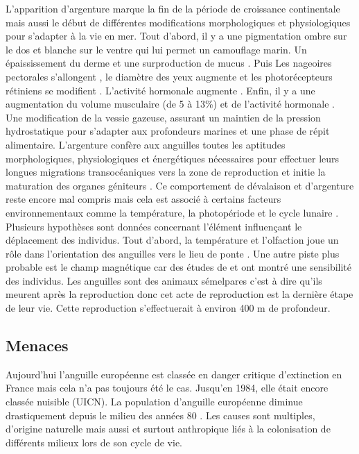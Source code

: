 \documentclass[11pt,titlepage,twoside]{article}\usepackage[]{graphicx}\usepackage[table]{xcolor}
\begin{document}
L’apparition d’argenture marque la fin de la période de croissance continentale mais aussi le début de différentes modifications morphologiques et physiologiques pour s’adapter à la vie en mer. Tout d’abord, il y a une pigmentation ombre sur le dos et blanche sur le ventre qui lui permet un camouflage marin. Un épaississement du derme et une surproduction de mucus \citep{saglio_structural_1988}.  Puis Les nageoires pectorales s’allongent \citep{durif_migration_2003}, le diamètre des yeux augmente et les photorécepteurs rétiniens se modifient \citep{adam_anguille_1997}. L’activité hormonale augmente \citep{lecomte-finiger_metamorphose_1990, pankhurst_structure_2006}. Enfin, il y a une augmentation du volume musculaire (de 5 à 13\%) et de l’activité hormonale \citep{lecomte-finiger_metamorphose_1990, pankhurst_structure_2006}. Une modification de la vessie gazeuse, assurant un maintien de la pression hydrostatique pour s’adapter aux profondeurs marines \citep{lecomte-finiger_metamorphose_1990} et une phase de répit alimentaire. L’argenture confère aux anguilles toutes les aptitudes morphologiques, physiologiques et énergétiques nécessaires pour effectuer leurs longues migrations transocéaniques vers la zone de reproduction et initie la maturation des organes géniteurs \citep{durif_durif_2009}. Ce comportement de dévalaison et d’argenture reste encore mal compris mais cela est associé à certains facteurs environnementaux comme la température, la photopériode et le cycle lunaire \citep{bruijs_silver_2009}. Plusieurs hypothèses sont données concernant l’élément influençant le déplacement des individus. Tout d’abord, la température et l’olfaction joue un rôle dans l’orientation des anguilles vers le lieu de ponte \citep{westin_orientation_1990}. Une autre piste plus probable est le champ magnétique car des études de \citep{nishi_magnetic_2004} et \citep{wu_neural_2012} ont montré une sensibilité des individus. Les anguilles sont des animaux sémelpares c’est à dire qu’ils meurent après la reproduction donc cet acte de reproduction est la dernière étape de leur vie. Cette reproduction s’effectuerait à environ 400 m de profondeur.

\subsection{Menaces }

Aujourd’hui l’anguille européenne est classée en danger critique d’extinction en France mais cela n’a pas toujours été le cas. Jusqu’en 1984, elle était encore classée nuisible (UICN). La population d’anguille européenne diminue drastiquement depuis le milieu des années 80 \citep{brusle_anguille_1994}. Les causes sont multiples, d’origine naturelle mais aussi et surtout anthropique liés à la colonisation de différents milieux lors de son cycle de vie.
\end{document}
